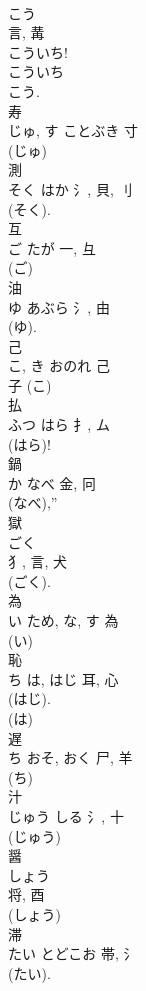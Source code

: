 \documentclass[8pt]{extreport}
\begin{document}
\begin{CJK}{UTF8}{min}
\\	こう	
\\	言, 冓	
\\	こういち! 
\\	こういち 
\\	こう.
\\	寿	
\\	じゅ, す	ことぶき	寸		
\\	(じゅ) 
\\	測	
\\	そく	はか	氵, 貝, 刂	
\\	(そく). 
\\	互	
\\	ご	たが	一, 彑	
\\	(ご) 
\\	油	
\\	ゆ	あぶら	氵, 由	
\\	(ゆ). 
\\	己	
\\	こ, き	おのれ	己	
\\	子 (こ) 
\\	払	
\\	ふつ	はら	扌, ム	
\\	(はら)! 
\\	鍋	
\\	か	なべ	金, 冋	
\\	(なべ),” 
\\	獄	
\\	ごく	
\\	犭, 言, 犬	
\\	(ごく). 
\\	為	
\\	い	ため, な, す	為	
\\	(い) 
\\	恥	
\\	ち	は, はじ	耳, 心	
\\	(はじ). 
\\	(は) 
\\	遅	
\\	ち	おそ, おく	尸, 羊		
\\	(ち) 
\\	汁	
\\	じゅう	しる	氵, 十	
\\	(じゅう) 
\\	醤	
\\	しょう	
\\	将, 酉	
\\	(しょう) 
\\	滞	
\\	たい	とどこお	帯, 氵	
\\	(たい). 

\end{CJK}
\end{document}
